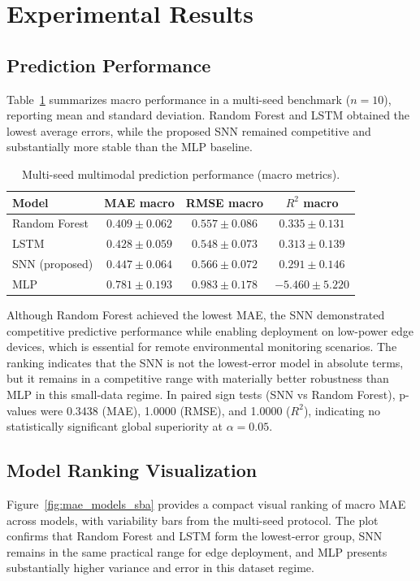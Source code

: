 \section{Experimental Results}

\subsection{Prediction Performance}
Table~\ref{tab:pred_perf} summarizes macro performance in a multi-seed benchmark ($n=10$), reporting mean and standard deviation. Random Forest and LSTM obtained the lowest average errors, while the proposed SNN remained competitive and substantially more stable than the MLP baseline.

\begin{table}[!h]
\caption{Multi-seed multimodal prediction performance (macro metrics).}
\label{tab:pred_perf}
\centering
\footnotesize
\setlength{\tabcolsep}{3pt}
\begin{tabular}{lccc}
\toprule
Model & MAE macro & RMSE macro & $R^2$ macro \\
\midrule
Random Forest & $\mathbf{0.409 \pm 0.062}$ & $0.557 \pm 0.086$ & $\mathbf{0.335 \pm 0.131}$ \\
LSTM & $0.428 \pm 0.059$ & $\mathbf{0.548 \pm 0.073}$ & $0.313 \pm 0.139$ \\
SNN (proposed) & $0.447 \pm 0.064$ & $0.566 \pm 0.072$ & $0.291 \pm 0.146$ \\
MLP & $0.781 \pm 0.193$ & $0.983 \pm 0.178$ & $-5.460 \pm 5.220$ \\
\bottomrule
\end{tabular}
\end{table}

Although Random Forest achieved the lowest MAE, the SNN demonstrated competitive predictive performance while enabling deployment on low-power edge devices, which is essential for remote environmental monitoring scenarios. The ranking indicates that the SNN is not the lowest-error model in absolute terms, but it remains in a competitive range with materially better robustness than MLP in this small-data regime. In paired sign tests (SNN vs Random Forest), p-values were 0.3438 (MAE), 1.0000 (RMSE), and 1.0000 ($R^2$), indicating no statistically significant global superiority at $\alpha=0.05$.

\subsection{Model Ranking Visualization}
Figure~\ref{fig:mae_models_sba} provides a compact visual ranking of macro MAE across models, with variability bars from the multi-seed protocol. The plot confirms that Random Forest and LSTM form the lowest-error group, SNN remains in the same practical range for edge deployment, and MLP presents substantially higher variance and error in this dataset regime.

